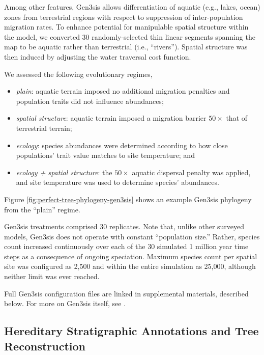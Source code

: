 Among other features, Gen3sis allows differentiation of aquatic (e.g., lakes, ocean) zones from terrestrial regions with respect to suppression of inter-population migration rates.
To enhance potential for manipulable spatial structure within the model, we converted 30 randomly-selected thin linear segments spanning the map to be aquatic rather than terrestrial (i.e., ``rivers'').
Spatial structure was then induced by adjusting the water traversal cost function.



We assessed the following evolutionary regimes,
\begin{itemize}
\item \textit{plain}: aquatic terrain imposed no additional migration penalties and population traits did not influence abundances;
\item \textit{spatial structure}: aquatic terrain imposed a migration barrier $50\times$ that of terrestrial terrain;
\item \textit{ecology}: species abundances were determined according to how close populations' trait value matches to site temperature; and
\item \textit{ecology + spatial structure}: the $50\times$ aquatic dispersal penalty was applied, and site temperature was used to determine species' abundances.
\end{itemize}
Figure \ref{fig:perfect-tree-phylogeny-gen3sis} shows an example Gen3sis phylogeny from the ``plain'' regime.

Gen3sis treatments comprised 30 replicates.
Note that, unlike other surveyed models, Gen3sis does not operate with constant ``population size.''
Rather, species count increased continuously over each of the 30 simulated 1 million year time steps as a consequence of ongoing speciation.
Maximum species count per spatial site was configured as 2,500 and within the entire simulation as 25,000, although neither limit was ever reached.

Full Gen3sis configuration files are linked in supplemental materials, described below.
For more on Gen3sis itself, see \citep{hagen2021gen3sis}.

\subsection{Hereditary Stratigraphic Annotations and Tree Reconstruction}

